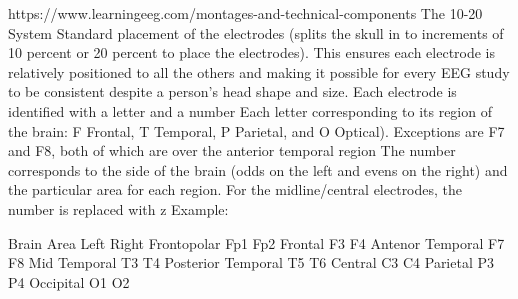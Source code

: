 \documentclass{article}
\begin{document}
https://www.learningeeg.com/montages-and-technical-components
The 10-20 System
Standard placement of the electrodes (splits the skull in to increments of 10 percent or 20 percent to place the electrodes). This ensures each electrode is relatively positioned to all the others and making it possible for every EEG study to be consistent despite a person’s head shape and size.
Each electrode is identified with a letter and a number 
Each letter corresponding to its region of the brain: F Frontal, T Temporal, P Parietal, and O Optical). Exceptions are F7 and F8, both of which are over the anterior temporal region 
The number corresponds to the side of the brain (odds on the left and evens on the right) and the particular area for each region. For the midline/central electrodes, the number is replaced with z
Example:


Brain Area
Left 
Right
Frontopolar 
Fp1
Fp2
Frontal
F3
F4
Antenor Temporal
F7
F8
Mid Temporal
T3
T4
Posterior Temporal
T5
T6
Central
C3
C4
Parietal
P3
P4
Occipital 
O1
O2
\end{document}
